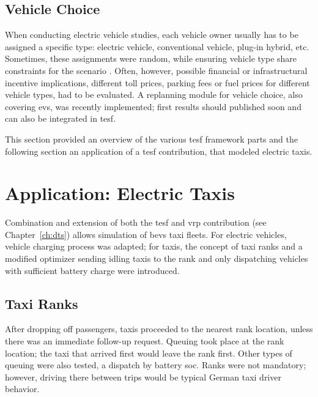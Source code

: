 \subsection{Vehicle Choice}
When conducting electric vehicle studies, each vehicle owner usually has to be assigned a specific type: \eg electric vehicle, conventional vehicle, plug-in hybrid, etc. Sometimes, these assignments were random, while ensuring vehicle type share constraints for the scenario \citep[e.g.,][]{WaraichEtAl_JanssensEtAl_2014}. Often, however, possible financial or infrastructural incentive implications, \eg different toll prices, parking fees or fuel prices for different vehicle types, had to be evaluated. A replanning module for vehicle choice, also covering \glspl{ev}, was recently implemented; first results should published soon and can also be integrated in \gls{tesf}.

This section provided an overview of the various \gls{tesf} framework parts and the following section an application of a \gls{tesf} contribution, that modeled electric taxis.

\section{Application: Electric Taxis} %
Combination and extension of both the \gls{tesf} and \gls{vrp} contribution (see Chapter~\ref{ch:dts}) allows simulation of \glspl{bev} taxi fleets.
For electric vehicles, vehicle charging process was adapted; for taxis, the concept of taxi ranks and a modified optimizer sending idling taxis to the rank and only dispatching vehicles with sufficient battery charge were introduced. 

\subsection{Taxi Ranks}
After dropping off passengers, taxis proceeded to the nearest rank location, unless there was an immediate follow-up request. 
Queuing took place at the rank location; the taxi that arrived first would leave the rank first. 
Other types of queuing were also tested, \eg a dispatch by battery \gls{soc}.
Ranks were not mandatory; however, driving there between trips would be typical German taxi driver behavior.


